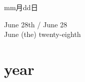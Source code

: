 \documentclass[aspectratio=169,xcolor={dvipsnames,table}]{beamer}
\begin{document}
\begin{frame}[plain]{mm月dd日}
 
\begin{description}[　　　　　　　　　　　　]
 \item[6月28日] June 28th / June 28\\
               June (the) twenty-eighth
\end{description}




\vspace{30pt}




\end{frame}

\section{year}
\end{document}
